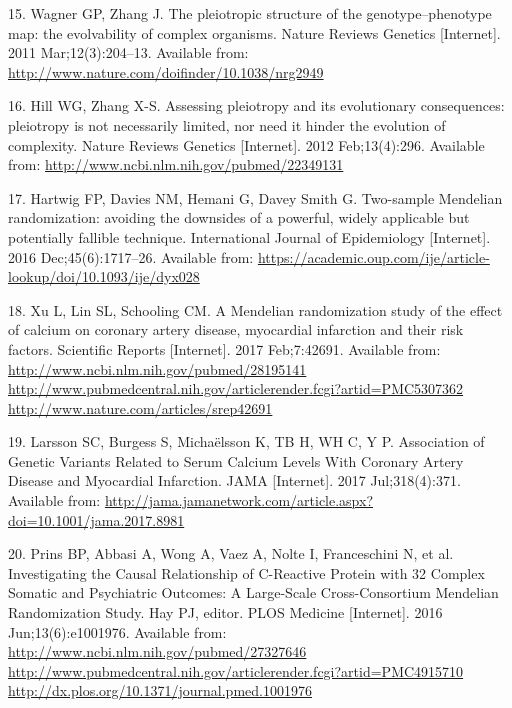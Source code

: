 \documentclass[]{article}
\begin{document}
\hypertarget{ref-Wagner2011}{}
15. Wagner GP, Zhang J. The pleiotropic structure of the
genotype--phenotype map: the evolvability of complex organisms. Nature
Reviews Genetics {[}Internet{]}. 2011 Mar;12(3):204--13. Available from:
\url{http://www.nature.com/doifinder/10.1038/nrg2949}

\hypertarget{ref-Hill2012a}{}
16. Hill WG, Zhang X-S. Assessing pleiotropy and its evolutionary
consequences: pleiotropy is not necessarily limited, nor need it hinder
the evolution of complexity. Nature Reviews Genetics {[}Internet{]}.
2012 Feb;13(4):296. Available from:
\url{http://www.ncbi.nlm.nih.gov/pubmed/22349131}

\hypertarget{ref-Hartwig2016}{}
17. Hartwig FP, Davies NM, Hemani G, Davey Smith G. Two-sample Mendelian
randomization: avoiding the downsides of a powerful, widely applicable
but potentially fallible technique. International Journal of
Epidemiology {[}Internet{]}. 2016 Dec;45(6):1717--26. Available from:
\url{https://academic.oup.com/ije/article-lookup/doi/10.1093/ije/dyx028}

\hypertarget{ref-Xu2017}{}
18. Xu L, Lin SL, Schooling CM. A Mendelian randomization study of the
effect of calcium on coronary artery disease, myocardial infarction and
their risk factors. Scientific Reports {[}Internet{]}. 2017 Feb;7:42691.
Available from:
\href{http://www.ncbi.nlm.nih.gov/pubmed/28195141\%20http://www.pubmedcentral.nih.gov/articlerender.fcgi?artid=PMC5307362\%20http://www.nature.com/articles/srep42691}{http://www.ncbi.nlm.nih.gov/pubmed/28195141 http://www.pubmedcentral.nih.gov/articlerender.fcgi?artid=PMC5307362 http://www.nature.com/articles/srep42691}

\hypertarget{ref-Larsson2017}{}
19. Larsson SC, Burgess S, Michaëlsson K, TB H, WH C, Y P. Association
of Genetic Variants Related to Serum Calcium Levels With Coronary Artery
Disease and Myocardial Infarction. JAMA {[}Internet{]}. 2017
Jul;318(4):371. Available from:
\url{http://jama.jamanetwork.com/article.aspx?doi=10.1001/jama.2017.8981}

\hypertarget{ref-Prins2016}{}
20. Prins BP, Abbasi A, Wong A, Vaez A, Nolte I, Franceschini N, et al.
Investigating the Causal Relationship of C-Reactive Protein with 32
Complex Somatic and Psychiatric Outcomes: A Large-Scale Cross-Consortium
Mendelian Randomization Study. Hay PJ, editor. PLOS Medicine
{[}Internet{]}. 2016 Jun;13(6):e1001976. Available from:
\href{http://www.ncbi.nlm.nih.gov/pubmed/27327646\%20http://www.pubmedcentral.nih.gov/articlerender.fcgi?artid=PMC4915710\%20http://dx.plos.org/10.1371/journal.pmed.1001976}{http://www.ncbi.nlm.nih.gov/pubmed/27327646 http://www.pubmedcentral.nih.gov/articlerender.fcgi?artid=PMC4915710 http://dx.plos.org/10.1371/journal.pmed.1001976}
\end{document}
